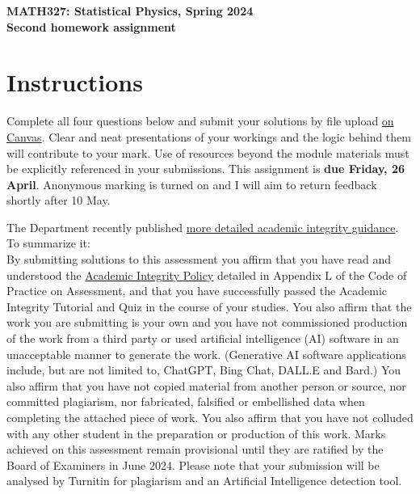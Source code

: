 \documentclass[12 pt]{article} %
\begin{document}
\newcommand{\thisweek}{MATH327 Homework 2}
\newcommand{\moddate}{Last modified 8 Apr.~2024}
\begin{center}
  {\Large \textbf{MATH327: Statistical Physics, Spring 2024}} \\[12 pt]
  {\Large \textbf{Second homework assignment}} \\[24 pt]
\end{center}

\section*{Instructions}
Complete all four questions below and submit your solutions by file upload \href{https://canvas.liverpool.ac.uk/courses/69036/assignments/263585}{on Canvas}.
Clear and neat presentations of your workings and the logic behind them will contribute to your mark.
Use of resources beyond the module materials must be explicitly referenced in your submissions.
This assignment is \textbf{due Friday, 26 April}.
Anonymous marking is turned on and I will aim to return feedback shortly after 10 May.

\vfill
The Department recently published \href{https://canvas.liverpool.ac.uk/files/10656162/}{more detailed academic integrity guidance}.
To summarize it: \\
By submitting solutions to this assessment you affirm that you have read and understood the \href{https://www.liverpool.ac.uk/media/livacuk/tqsd/code-of-practice-on-assessment/appendix_L_cop_assess.pdf}{Academic Integrity Policy} detailed in Appendix L of the Code of Practice on Assessment, and that you have successfully passed the Academic Integrity Tutorial and Quiz in the course of your studies.
You also affirm that the work you are submitting is your own and you have not commissioned production of the work from a third party or used artificial intelligence (AI) software in an unacceptable manner to generate the work.
(Generative AI software applications include, but are not limited to, ChatGPT, Bing Chat, DALL.E and Bard.)
You also affirm that you have not copied material from another person or source, nor committed plagiarism, nor fabricated, falsified or embellished data when completing the attached piece of work.
You also affirm that you have not colluded with any other student in the preparation or production of this work.
Marks achieved on this assessment remain provisional until they are ratified by the Board of Examiners in June 2024.
Please note that your submission will be analysed by Turnitin for plagiarism and an Artificial Intelligence detection tool.
\end{document}
